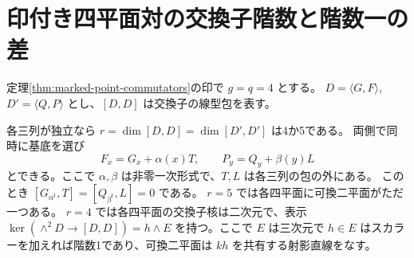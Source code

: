 \section{印付き四平面対の交換子階数と階数一の差}
\label{sec:paired-marked-four-planes}
定理\ref{thm:marked-point-commutators}の印で $g=q=4$ とする。
$D=\langle G,F\rangle$, $D'=\langle Q,P\rangle$ とし、$[D,D]$ は交換子の線型包を表す。
\begin{theorem}\label{thm:paired-marked-four-planes}
各三列が独立なら $r=\dim[D,D]=\dim[D',D']$ は4か5である。
両側で同時に基底を選び
\[
 F_x=G_x+\alpha(x)T,\qquad P_y=Q_y+\beta(y)L
\]
とできる。ここで $\alpha,\beta$ は非零一次形式で、$T,L$ は各三列の包の外にある。
このとき $[G_{\alpha^t},T]=[Q_{\beta^t},L]=0$ である。
$r=5$ では各四平面に可換二平面がただ一つある。
$r=4$ では各四平面の交換子核は二次元で、表示
$\ker(\wedge^2D\to[D,D])=h\wedge E$ を持つ。ここで $E$ は三次元で
$h\in E$ はスカラーを加えれば階数1であり、可換二平面は $k h$ を共有する射影直線をなす。
\end{theorem}
